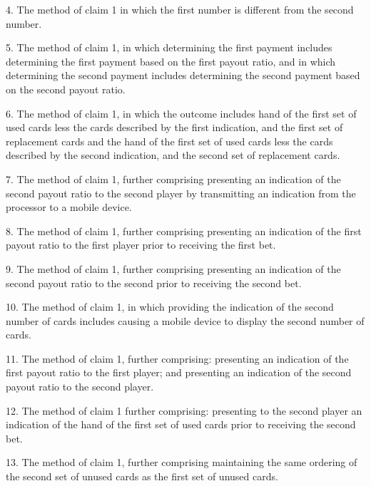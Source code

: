 \documentclass[11pt,a4paper]{article}
\begin{document}
4. The method of claim 1 in which the first number is different from the second number.

5. The method of claim 1, in which determining the first payment includes determining the first payment based on the first payout ratio, and in which determining the second payment includes determining the second payment based on the second payout ratio.

6. The method of claim 1, in which the outcome includes hand of the first set of used cards less the cards described by the first indication, and the first set of replacement cards and the hand of the first set of used cards less the cards described by the second indication, and the second set of replacement cards.

7. The method of claim 1, further comprising presenting an indication of the second payout ratio to the second player by transmitting an indication from the processor to a mobile device.

8. The method of claim 1, further comprising presenting an indication of the first payout ratio to the first player prior to receiving the first bet.

9. The method of claim 1, further comprising presenting an indication of the second payout ratio to the second prior to receiving the second bet.

10. The method of claim 1, in which providing the indication of the second number of cards includes causing a mobile device to display the second number of cards.

11. The method of claim 1, further comprising: presenting an indication of the first payout ratio to the first player; and presenting an indication of the second payout ratio to the second player.

12. The method of claim 1 further comprising: presenting to the second player an indication of the hand of the first set of used cards prior to receiving the second bet.

13. The method of claim 1, further comprising maintaining the same ordering of the second set of unused cards as the first set of unused cards.
\end{document}
